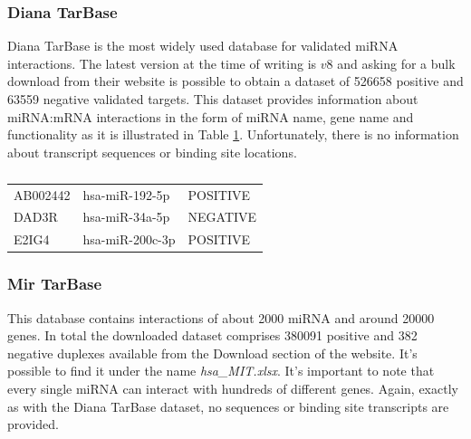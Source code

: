\subsubsection{Diana TarBase}
Diana TarBase is the most widely used database for validated miRNA interactions. The latest version at the time of writing is $v8$ and asking for a bulk download from their website is possible to obtain a dataset of 526658 positive and 63559 negative validated targets. This dataset provides information about miRNA:mRNA interactions in the form of miRNA name, gene name and functionality as it is illustrated in Table \ref{tab:Diana}. Unfortunately, there is no information about transcript sequences or binding site locations.

\begin{table}[!t]
	\caption{}
	\label{tab:Diana}
	\centering
	\begin{tabular}{l l l}
		\toprule
		\tabhead{gene name} & \tabhead{miRNA name} & \tabhead{functionality} \\
		\midrule
		AB002442 & hsa-miR-192-5p & POSITIVE\\
		DAD3R & hsa-miR-34a-5p & NEGATIVE\\
		E2IG4 & hsa-miR-200c-3p & POSITIVE\\
		\bottomrule
	\end{tabular}
\end{table}

\subsubsection{Mir TarBase}
This database contains interactions of about 2000 miRNA and around 20000 genes. In total the downloaded dataset comprises 380091 positive and 382 negative duplexes available from the Download section of the website. It's possible to find it under the name \textit{hsa\_MIT.xlsx}. It's important to note that every single miRNA can interact with hundreds of different genes. Again, exactly as with the Diana TarBase dataset, no sequences or binding site transcripts are provided.
 

